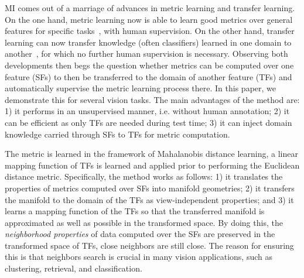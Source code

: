 \documentclass[10pt,twocolumn,letterpaper]{article}
\begin{document}
MI comes out of a marriage of advances in metric learning and transfer
learning. On the one hand, metric learning now is able to learn good
metrics over general features for specific tasks~\cite{metric:survey:12}, with human
supervision.
On the other hand, transfer learning can now transfer knowledge (often
classifiers) learned in one domain to
another~\cite{tl:survey}, for which no further human supervision is
necessary. Observing both developments then begs the question whether
metrics can be computed over one feature (\ie SFs) to then be
transferred to the domain of another feature (\ie TFs) and
automatically supervise the metric learning process there. 
In this paper, we demonstrate this for several vision tasks. The main
advantages of the method are: 1) it performs in an unsupervised
manner, i.e. without human annotation; 2) it can be efficient as only
TFs are needed during test time; 3) it can inject domain knowledge
carried through SFs to TFs for metric computation.  

The metric is learned in the framework of Mahalanobis distance
learning, \ie a linear mapping function of TFs is learned and applied
prior to performing the Euclidean distance metric. Specifically, the
method works as follows: 1) it translates the properties of metrics
computed over SFs into manifold geometries; 2) it transfers the
manifold to the domain of the TFs as view-independent properties; and
3) it learns a mapping function of the TFs so that the transferred
manifold is approximated as well as possible in the transformed
space. By doing this, the \emph{neighborhood properties} of data computed
over the SFs are preserved in the transformed space of TFs, \ie close
neighbors are still close. The reason for ensuring this is that
neighbors search is crucial in many vision applications,
such as clustering, retrieval, and classification.

\end{document}
